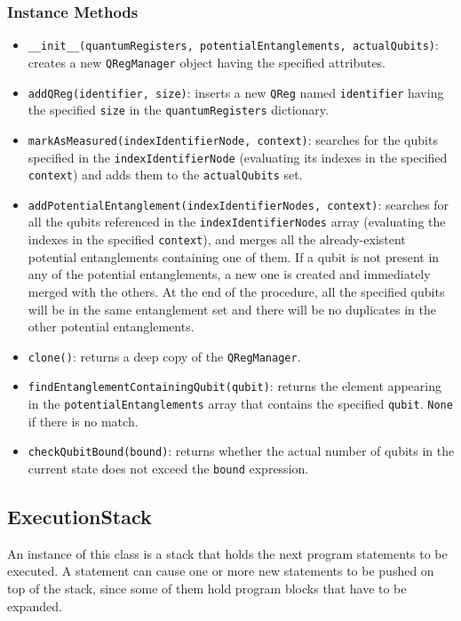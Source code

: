 \documentclass[12pt,a4paper]{report}
\theoremstyle{definition}
\theoremstyle{definition}
\theoremstyle{definition}
\begin{document}
\subsubsection{Instance Methods}
\begin{itemize}
    \itemsep 0em
    \item \texttt{\_\_init\_\_(quantumRegisters, potentialEntanglements, actualQubits)}: creates a new \texttt{QRegManager} object having the specified attributes.
    \item \texttt{addQReg(identifier, size)}: inserts a new \texttt{QReg} named \texttt{identifier} having the specified \texttt{size} in the \texttt{quantumRegisters} dictionary.
    \item \texttt{markAsMeasured(indexIdentifierNode, context)}: searches for the qubits specified in the \texttt{indexIdentifierNode} (evaluating its indexes in the specified \texttt{context}) and adds them to the \texttt{actualQubits} set.
    \item \texttt{addPotentialEntanglement(indexIdentifierNodes, context)}: searches for all the qubits referenced in the \texttt{indexIdentifierNodes} array (evaluating the indexes in the specified \texttt{context}), and merges all the already-existent potential entanglements containing one of them. If a qubit is not present in any of the potential entanglements, a new one is created and immediately merged with the others. At the end of the procedure, all the specified qubits will be in the same entanglement set and there will be no duplicates in the other potential entanglements.
    \item \texttt{clone()}: returns a deep copy of the \texttt{QRegManager}.
    \item \texttt{findEntanglementContainingQubit(qubit)}: returns the element appearing in the \texttt{potentialEntanglements} array that contains the specified \texttt{qubit}. \texttt{None} if there is no match.
    \item \texttt{checkQubitBound(bound)}: returns whether the actual number of qubits in the current state does not exceed the \texttt{bound} expression.
\end{itemize}

\subsection{ExecutionStack}
An instance of this class is a stack that holds the next program statements to be executed. A statement can cause one or more new statements to be pushed on top of the stack, since some of them hold program blocks that have to be expanded.
\end{document}
